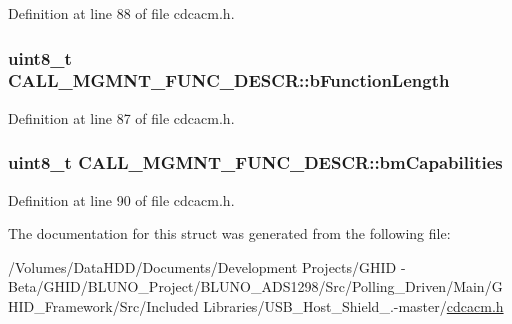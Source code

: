 \-Definition at line 88 of file cdcacm.\-h.

\hypertarget{struct_c_a_l_l___m_g_m_n_t___f_u_n_c___d_e_s_c_r_ae5ab7e23e6f5268f042b1cec3986867a}{
\subsubsection[{b\-Function\-Length}]{\setlength{\rightskip}{0pt plus 5cm}uint8\-\_\-t {\bf \-C\-A\-L\-L\-\_\-\-M\-G\-M\-N\-T\-\_\-\-F\-U\-N\-C\-\_\-\-D\-E\-S\-C\-R\-::b\-Function\-Length}}}\label{struct_c_a_l_l___m_g_m_n_t___f_u_n_c___d_e_s_c_r_ae5ab7e23e6f5268f042b1cec3986867a}


\-Definition at line 87 of file cdcacm.\-h.

\hypertarget{struct_c_a_l_l___m_g_m_n_t___f_u_n_c___d_e_s_c_r_a76161d5fa6c12239aad097f5010825c2}{
\subsubsection[{bm\-Capabilities}]{\setlength{\rightskip}{0pt plus 5cm}uint8\-\_\-t {\bf \-C\-A\-L\-L\-\_\-\-M\-G\-M\-N\-T\-\_\-\-F\-U\-N\-C\-\_\-\-D\-E\-S\-C\-R\-::bm\-Capabilities}}}\label{struct_c_a_l_l___m_g_m_n_t___f_u_n_c___d_e_s_c_r_a76161d5fa6c12239aad097f5010825c2}


\-Definition at line 90 of file cdcacm.\-h.



\-The documentation for this struct was generated from the following file\-:\begin{DoxyCompactItemize}
\item 
/\-Volumes/\-Data\-H\-D\-D/\-Documents/\-Development Projects/\-G\-H\-I\-D -\/ Beta/\-G\-H\-I\-D/\-B\-L\-U\-N\-O\-\_\-\-Project/\-B\-L\-U\-N\-O\-\_\-\-A\-D\-S1298/\-Src/\-Polling\-\_\-\-Driven/\-Main/\-G\-H\-I\-D\-\_\-\-Framework/\-Src/\-Included Libraries/\-U\-S\-B\-\_\-\-Host\-\_\-\-Shield\-\_.-\/master/\hyperlink{cdcacm_8h}{cdcacm.\-h}\end{DoxyCompactItemize}
